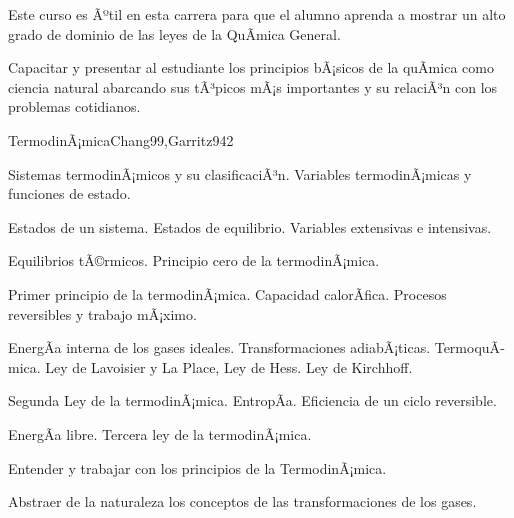 \begin{syllabus}


\begin{justification}
Este curso es Ãºtil en esta carrera para que el alumno aprenda a mostrar un alto grado de dominio de las leyes de la QuÃ­mica General.
\end{justification}

\begin{goals}
\item Capacitar y presentar al estudiante los principios bÃ¡sicos de la quÃ­mica como ciencia natural abarcando sus tÃ³picos mÃ¡s importantes y su relaciÃ³n con los problemas cotidianos.
\end{goals}

\begin{outcomes}
\end{outcomes}

\begin{unit}{TermodinÃ¡mica}{Chang99,Garritz94}{2}
\begin{topics}
	\item Sistemas termodinÃ¡micos y su clasificaciÃ³n. Variables termodinÃ¡micas y funciones de estado.
	\item Estados de un sistema. Estados de equilibrio. Variables extensivas e intensivas.
	\item Equilibrios tÃ©rmicos. Principio cero de la termodinÃ¡mica.
	\item Primer principio de la termodinÃ¡mica. Capacidad calorÃ­fica. Procesos reversibles y trabajo mÃ¡ximo.
	\item EnergÃ­a interna de los gases ideales. Transformaciones adiabÃ¡ticas. TermoquÃ­mica. Ley de Lavoisier y La Place, Ley de Hess. Ley de Kirchhoff.
	\item Segunda Ley de la termodinÃ¡mica. EntropÃ­a. Eficiencia de un ciclo reversible.
	\item EnergÃ­a libre. Tercera ley de la termodinÃ¡mica.
\end{topics}

\begin{unitgoals}
	\item Entender y trabajar con los principios de la TermodinÃ¡mica.
	\item Abstraer de la naturaleza los conceptos de las transformaciones de los gases.
\end{unitgoals}
\end{unit}


\end{syllabus}
